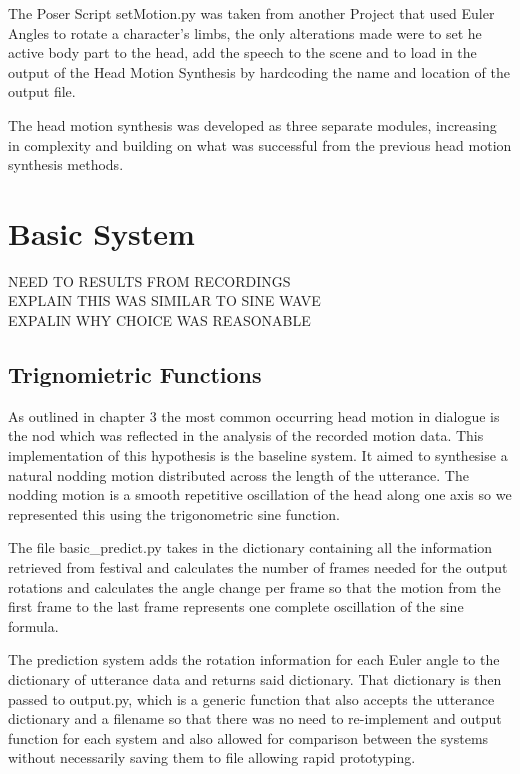 \documentclass[bsc,frontabs,twoside,singlespacing,parskip]{infthesis}
\begin{document}
The Poser Script setMotion.py was taken from another Project that used Euler Angles to rotate a character's limbs, the only alterations made were to set he active body part to the head, add the speech to the scene and to load in the output of the Head Motion Synthesis by hardcoding the name and location of the output file.

The head motion synthesis was developed as three separate modules, increasing in complexity and building on what was successful from the previous head motion synthesis methods.

\section{Basic System} 

NEED TO RESULTS FROM RECORDINGS \\
EXPLAIN THIS WAS SIMILAR TO SINE WAVE \\
EXPALIN WHY CHOICE WAS REASONABLE \\

\subsection{Trignomietric Functions}

As outlined in chapter 3 the most common occurring head motion in dialogue is the nod which was reflected in the analysis of the recorded motion data. This implementation of this hypothesis is the baseline system. It aimed to synthesise a natural nodding motion distributed across the length of the utterance. The nodding motion is a smooth repetitive oscillation of the head along one axis so we represented this using the trigonometric sine function. 

The file basic\_predict.py takes in the dictionary containing all the information retrieved from festival and calculates the number of frames needed for the output rotations and calculates the angle change per frame so that the motion from the first frame to the last frame represents one complete oscillation of the sine formula.

The prediction system adds the rotation information for each Euler angle to the dictionary of utterance data and returns said dictionary. That dictionary is then passed to output.py, which is a generic function that also accepts the utterance dictionary and a filename so that there was no need to re-implement and output function for each system and also allowed for comparison between the systems without necessarily saving them to file allowing rapid prototyping.
\end{document}
